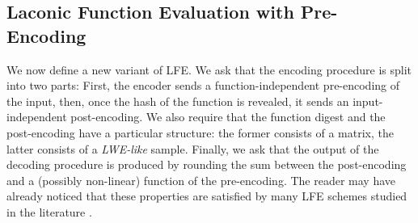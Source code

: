 \documentclass{theoretics}
\begin{document}
\subsection{Laconic Function Evaluation with Pre-Encoding}

We now define a new variant of LFE. We ask that the encoding procedure is split into two parts: First, the encoder sends a function-independent pre-encoding of the input, then, once the hash of the function is revealed, it sends an input-independent post-encoding. We also require that the function digest and the post-encoding have a particular structure: the former consists of a matrix, the latter consists of a \emph{LWE-like} sample. Finally, we ask that the output of the decoding procedure is produced by rounding the sum between the post-encoding and a (possibly non-linear) function of the pre-encoding. The reader may have already noticed that these properties are satisfied by many LFE schemes studied in the literature \cite{FOCS:QuaWeeWic18,FOCS:HsiLinLuo23,C:DHMWW24,C:Wee24}.
\end{document}
